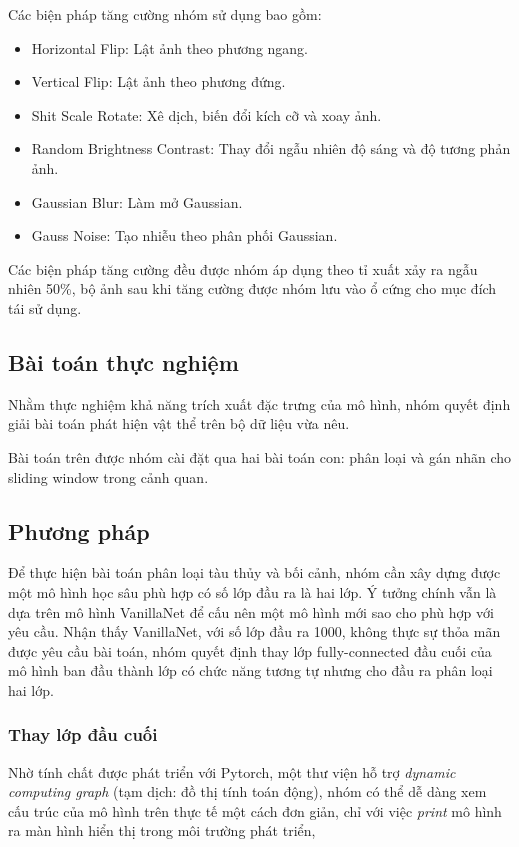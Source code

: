 \documentclass[a4paper,12pt]{article}
\begin{document}
Các biện pháp tăng cường nhóm sử dụng bao gồm:

\begin{itemize}
    \item Horizontal Flip: Lật ảnh theo phương ngang.
    \item Vertical Flip: Lật ảnh theo phương đứng.
    \item Shit Scale Rotate: Xê dịch, biến đổi kích cỡ và xoay ảnh.
    \item Random Brightness Contrast: Thay đổi ngẫu nhiên độ sáng và độ tương phản ảnh.
    \item Gaussian Blur: Làm mở Gaussian.
    \item Gauss Noise: Tạo nhiễu theo phân phối Gaussian.
\end{itemize}

Các biện pháp tăng cường đều được nhóm áp dụng theo tỉ xuất xảy ra ngẫu nhiên 50\%, bộ ảnh sau khi tăng cường được nhóm lưu vào ổ cứng cho mục đích tái sử dụng.

\subsection{Bài toán thực nghiệm}
Nhằm thực nghiệm khả năng trích xuất đặc trưng của mô hình, nhóm quyết định giải bài toán phát hiện vật thể trên bộ dữ liệu vừa nêu.

Bài toán trên được nhóm cài đặt qua hai bài toán con: phân loại và gán nhãn cho sliding window trong cảnh quan.

\subsection{Phương pháp}
Để thực hiện bài toán phân loại tàu thủy và bối cảnh, nhóm cần xây dựng được một mô hình học sâu phù hợp có số lớp đầu ra là hai lớp. Ý tưởng chính vẫn là dựa trên mô hình VanillaNet để cấu nên một mô hình mới sao cho phù hợp với yêu cầu. Nhận thấy VanillaNet, với số lớp đầu ra 1000, không thực sự thỏa mãn được yêu cầu bài toán, nhóm quyết định thay lớp fully-connected đầu cuối của mô hình ban đầu thành lớp có chức năng tương tự nhưng cho đầu ra phân loại hai lớp.

\subsubsection{Thay lớp đầu cuối}
Nhờ tính chất được phát triển với Pytorch, một thư viện hỗ trợ \emph{dynamic computing graph} (tạm dịch: đồ thị tính toán động), nhóm có thể dễ dàng xem cấu trúc của mô hình trên thực tế một cách đơn giản, chỉ với việc \emph{print} mô hình ra màn hình hiển thị trong môi trường phát triển,
\end{document}

